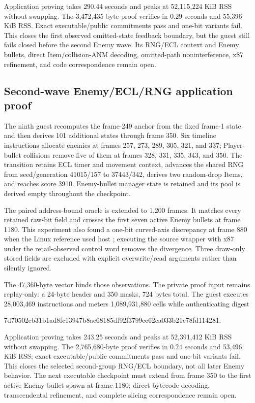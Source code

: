 Application proving takes 290.44 seconds and peaks at 52,115,224 KiB RSS
without swapping.  The 3,472,435-byte proof verifies in 0.29 seconds and
55,396 KiB RSS.  Exact executable/public commitments pass and one-bit variants
fail.  This closes the first observed omitted-state feedback boundary, but the
guest still fails closed before the second Enemy wave.  Its RNG/ECL context and
Enemy bullets, direct Item/collision-ANM decoding, omitted-path
noninterference, x87 refinement, and code correspondence remain open.

\subsection{Second-wave Enemy/ECL/RNG application proof}

The ninth guest recomputes the frame-249 anchor from the fixed frame-1 state
and then derives 101 additional states through frame 350.  Six timeline
instructions allocate enemies at frames 257, 273, 289, 305, 321, and 337;
Player-bullet collisions remove five of them at frames 328, 331, 335, 343,
and 350.  The transition retains ECL timer and movement context, advances the
shared RNG from seed/generation 41015/157 to 37443/342, derives two random-drop
Items, and reaches score 3910.  Enemy-bullet manager state is retained and its
pool is derived empty throughout the checkpoint.

The paired address-bound oracle is extended to 1,200 frames.  It matches every
retained raw-bit field and crosses the first seven active Enemy bullets at
frame 1180.  This experiment also found a one-bit curved-axis discrepancy at
frame 880 when the Linux reference used host ; executing the source
wrapper with x87  under the retail-observed control word
 removes the divergence.  Three draw-only stored fields are
excluded with explicit overwrite/read arguments rather than silently ignored.

The 47,360-byte  vector binds those observations.  The private
 proof input remains replay-only: a 24-byte header and 350 masks,
724 bytes total.  The guest executes 28,003,469 instructions and meters
1,089,931,880 cells while authenticating digest
\begin{center}
\small\ttfamily
7d70502eb31b1ad8fc13947b8ae68185df92f3799ee62ca033b21c78fd114281.
\end{center}
Application proving takes 243.25 seconds and peaks at 52,391,412 KiB RSS
without swapping.  The 2,765,680-byte proof verifies in 0.24 seconds and
53,496 KiB RSS; exact executable/public commitments pass and one-bit variants
fail.
This closes the selected second-group RNG/ECL boundary, not all later Enemy
behavior.  The next executable checkpoint must extend from frame 350 to the
first active Enemy-bullet spawn at frame 1180; direct bytecode decoding,
transcendental refinement, and complete slicing correspondence remain open.

